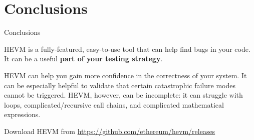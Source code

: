 \documentclass{beamer}
\begin{document}
\section{Conclusions}
\begin{frame}{Conclusions}

HEVM is a fully-featured, easy-to-use tool that can help find bugs in your code. It can be a useful \textbf{part of your testing strategy}.
\bigskip

HEVM can help you gain more confidence in the correctness of your system. It can be especially helpful to validate that certain catastrophic failure modes cannot be triggered. HEVM, however, can be incomplete: it can struggle with loops, complicated/recursive call chains, and complicated mathematical expressions.
\bigskip

Download HEVM from \url{https://github.com/ethereum/hevm/releases}
\smallskip


\end{frame}
\end{document}

